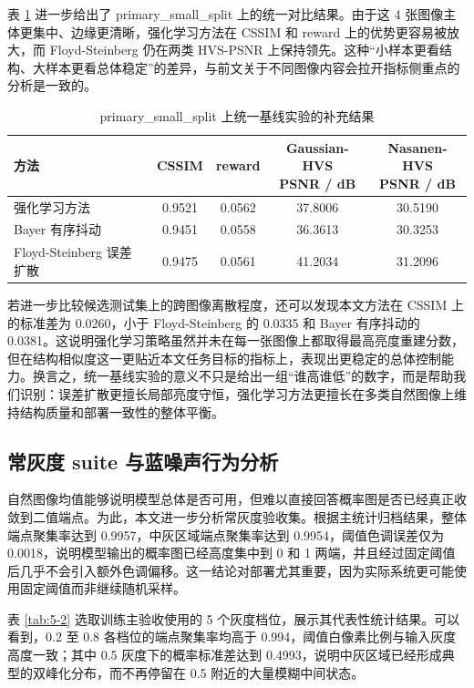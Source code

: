 \documentclass[thesis]{../zstucs-graduation-project}
\begin{document}
表 \ref{tab:5-1c} 进一步给出了 primary\_small\_split 上的统一对比结果。由于这 4 张图像主体更集中、边缘更清晰，强化学习方法在 CSSIM 和 reward 上的优势更容易被放大，而 Floyd-Steinberg 仍在两类 HVS-PSNR 上保持领先。这种“小样本更看结构、大样本更看总体稳定”的差异，与前文关于不同图像内容会拉开指标侧重点的分析是一致的。

\begin{table}[H]
    \centering
    \small
    \caption{primary\_small\_split 上统一基线实验的补充结果}
    \label{tab:5-1c}
    \setlength{\tabcolsep}{3pt}
    \begin{tabular}{lcccc}
        \toprule
        方法 & CSSIM & reward & \shortstack{Gaussian-HVS\\PSNR / dB} & \shortstack{Nasanen-HVS\\PSNR / dB} \\
        \midrule
        强化学习方法 & 0.9521 & 0.0562 & 37.8006 & 30.5190 \\
        Bayer 有序抖动 & 0.9451 & 0.0558 & 36.3613 & 30.3253 \\
        Floyd-Steinberg 误差扩散 & 0.9475 & 0.0561 & 41.2034 & 31.2096 \\
        \bottomrule
    \end{tabular}
\end{table}

若进一步比较候选测试集上的跨图像离散程度，还可以发现本文方法在 CSSIM 上的标准差为 0.0260，小于 Floyd-Steinberg 的 0.0335 和 Bayer 有序抖动的 0.0381。这说明强化学习策略虽然并未在每一张图像上都取得最高亮度重建分数，但在结构相似度这一更贴近本文任务目标的指标上，表现出更稳定的总体控制能力。换言之，统一基线实验的意义不只是给出一组“谁高谁低”的数字，而是帮助我们识别：误差扩散更擅长局部亮度守恒，强化学习方法更擅长在多类自然图像上维持结构质量和部署一致性的整体平衡。

\subsection{常灰度 suite 与蓝噪声行为分析}
自然图像均值能够说明模型总体是否可用，但难以直接回答概率图是否已经真正收敛到二值端点。为此，本文进一步分析常灰度验收集。根据主统计归档结果，整体端点聚集率达到 0.9957，中灰区域端点聚集率达到 0.9954，阈值色调误差仅为 0.0018，说明模型输出的概率图已经高度集中到 0 和 1 两端，并且经过固定阈值后几乎不会引入额外色调偏移。这一结论对部署尤其重要，因为实际系统更可能使用固定阈值而非继续随机采样。

表 \ref{tab:5-2} 选取训练主验收使用的 5 个灰度档位，展示其代表性统计结果。可以看到，0.2 至 0.8 各档位的端点聚集率均高于 0.994，阈值白像素比例与输入灰度高度一致；其中 0.5 灰度下的概率标准差达到 0.4993，说明中灰区域已经形成典型的双峰化分布，而不再停留在 0.5 附近的大量模糊中间状态。
\end{document}
